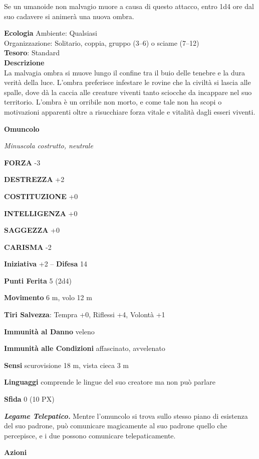 \begin{multicols}{2}
	Se un umanoide non malvagio muore a causa di questo attacco, entro 1d4 ore dal suo cadavere si animerà una nuova ombra.

	\textbf{Ecologia}
	Ambiente: Qualsiasi\\
	Organizzazione: Solitario, coppia, gruppo (3–6) o sciame (7–12)\\
	\textbf{Tesoro}: Standard\\

	\textbf{Descrizione}\\
	La malvagia ombra si muove lungo il confine tra il buio delle tenebre e la dura verità della luce. L’ombra preferisce infestare le rovine che la civiltà si lascia alle spalle, dove dà la caccia alle creature viventi tanto sciocche da incappare nel suo territorio. L’ombra è un orribile non morto, e come tale non ha scopi o motivazioni apparenti oltre a risucchiare forza vitale e vitalità dagli esseri viventi.


	\medskip{}\textbf{Omuncolo}

	\textit{Minuscola costrutto, neutrale}

	\textbf{FORZA} -3

	\textbf{DESTREZZA} +2

	\textbf{COSTITUZIONE} +0

	\textbf{INTELLIGENZA} +0

	\textbf{SAGGEZZA} +0

	\textbf{CARISMA} -2

	\textbf{Iniziativa} +2 -- \textbf{Difesa} 14

	\textbf{Punti Ferita} 5 (2d4)

	\textbf{Movimento} 6 m, volo 12 m

	\textbf{Tiri Salvezza}: Tempra +0, Riflessi +4, Volontà +1

	\textbf{Immunità al Danno} veleno

	\textbf{Immunità alle Condizioni} affascinato, avvelenato

	\textbf{Sensi} scurovisione 18 m, vista cieca 3 m

	\textbf{Linguaggi} comprende le lingue del suo creatore ma non può parlare

	\textbf{Sfida} 0 (10 PX)

	\textit{\textbf{Legame Telepatico.}} Mentre l'omuncolo si trova sullo stesso piano di esistenza del suo padrone, può comunicare magicamente al suo padrone quello che percepisce, e i due possono comunicare telepaticamente.

	\textbf{Azioni}


\end{multicols}

